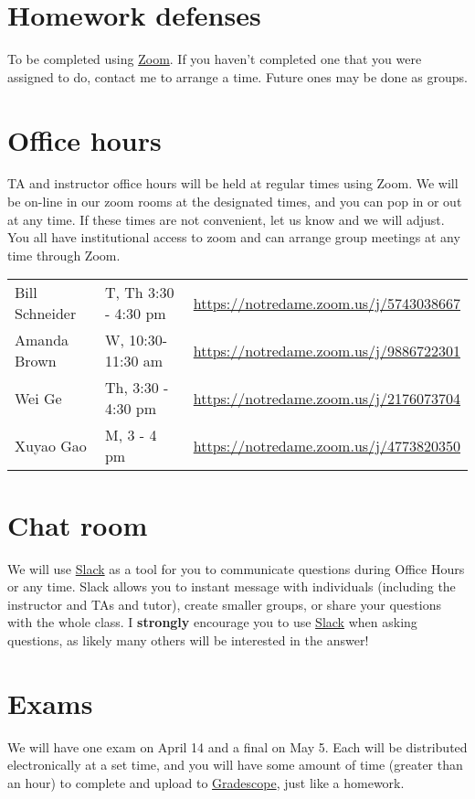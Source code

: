 \documentclass[11pt]{article}
\begin{document}
\section{Homework defenses}
\label{sec:org85fa5fd}
To be completed using \href{https://notredame.zoom.us/meeting}{Zoom}.  If you haven't completed one that you were assigned to do, contact me to arrange a time.  Future ones may be done as groups.

\section{Office hours}
\label{sec:org042cbd0}
TA and instructor office hours will be held at regular times using Zoom.  We will be on-line in our zoom rooms at the designated times, and you can pop in or out at any time. If these times are not convenient, let us know and we will adjust. You all have institutional access to zoom and can arrange group meetings at any time through Zoom.

\begin{center}
\begin{tabular}{lll}
Bill Schneider & T, Th 3:30 - 4:30 pm & \url{https://notredame.zoom.us/j/5743038667}\\
Amanda Brown & W, 10:30- 11:30 am & \url{https://notredame.zoom.us/j/9886722301}\\
Wei Ge & Th, 3:30 - 4:30 pm & \url{https://notredame.zoom.us/j/2176073704}\\
Xuyao Gao & M, 3 - 4 pm & \url{https://notredame.zoom.us/j/4773820350}\\
\end{tabular}
\end{center}

\section{Chat room}
\label{sec:org9070c27}
We will use \href{https://che30324-nd.slack.com}{Slack} as a tool for you to communicate questions during Office Hours or any time. Slack allows you to instant message with individuals (including the instructor and TAs and tutor), create smaller groups, or share your questions with the whole class. I \textbf{strongly} encourage you to use  \href{https://che30324-nd.slack.com}{Slack} when asking questions, as likely many others will be interested in the answer!


\section{Exams}
\label{sec:orgdcca172}
We will have one exam on April 14 and a final on May 5.  Each will be distributed electronically at a set time, and you will have some amount of time (greater than an hour) to complete and upload to \href{https://www.gradescope.com/}{Gradescope}, just like a homework.  
\end{document}
